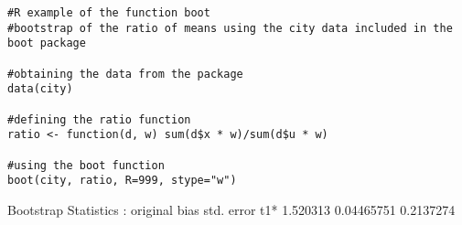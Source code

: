 \documentclass[12pt]{article}
\begin{document}
\begin{framed}
\begin{verbatim}
#R example of the function boot
#bootstrap of the ratio of means using the city data included in the boot package

#obtaining the data from the package
data(city)

#defining the ratio function
ratio <- function(d, w) sum(d$x * w)/sum(d$u * w)

#using the boot function
boot(city, ratio, R=999, stype="w")
\end{verbatim}
\end{framed} 


Bootstrap Statistics :
    original     bias    std. error
t1* 1.520313 0.04465751   0.2137274
\end{document}
